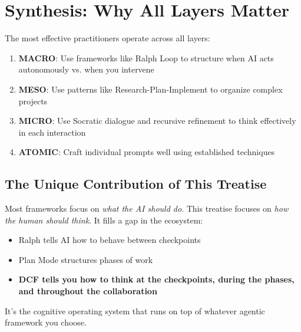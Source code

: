 \chapter{Synthesis: Why All Layers Matter}

The most effective practitioners operate across all layers:

\begin{enumerate}
    \item \textbf{MACRO}: Use frameworks like Ralph Loop to structure when AI acts autonomously vs. when you intervene
    \item \textbf{MESO}: Use patterns like Research-Plan-Implement to organize complex projects
    \item \textbf{MICRO}: Use Socratic dialogue and recursive refinement to think effectively in each interaction
    \item \textbf{ATOMIC}: Craft individual prompts well using established techniques
\end{enumerate}

\section{The Unique Contribution of This Treatise}

Most frameworks focus on \emph{what the AI should do}. This treatise focuses on \emph{how the human should think}. It fills a gap in the ecosystem:

\begin{itemize}
    \item Ralph tells AI how to behave between checkpoints
    \item Plan Mode structures phases of work
    \item \textbf{DCF tells you how to think at the checkpoints, during the phases, and throughout the collaboration}
\end{itemize}

It's the cognitive operating system that runs on top of whatever agentic framework you choose.

